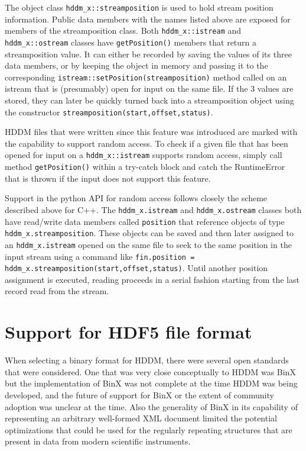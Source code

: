 \documentclass{revtex4}
\begin{document}
The object class \texttt{hddm\_x::streamposition} is used to hold stream
position information. Public data members with the names listed above are
exposed for members of the streamposition class. Both \texttt{hddm\_x::istream}
and \texttt{hddm\_x::ostream} classes have \texttt{getPosition()} members that
return a streamposition value. It can either be recorded by saving the values
of its three data members, or by keeping the object in memory and passing it
to the corresponding \texttt{istream::setPosition(streamposition)} method
called on an istream that is (presumably) open for input on the same file.
If the 3 values are stored, they can later be quickly turned back into a
streamposition object using the constructor 
\texttt{streamposition(start,offset,status)}.

HDDM files that were written since this feature was introduced are marked
with the capability to support random access. To check if a given file that
has been opened for input on a \texttt{hddm\_x::istream} supports random access,
simply call method \texttt{getPosition()} within a try-{}catch block and catch
the RuntimeError that is thrown if the input does not support this feature.

Support in the python API for random access follows closely the scheme
described above for C++. The \texttt{hddm\_x.istream} and 
\texttt{hddm\_x.ostream} classes both have read/write data members called
\texttt{position} that reference objects of type \texttt{hddm\_x.streamposition}.
These objects can be saved and then later assigned to an
\texttt{hddm\_x.istream} opened on the same file to seek to the same position
in the input stream using a command like
\texttt{fin.position = hddm\_x.streamposition(start,offset,status)}. Until
another position assignment is executed, reading proceeds in a serial
fashion starting from the last record read from the stream.

\section{Support for HDF5 file format}

When selecting a binary format for HDDM, there were several open standards
that were considered. One that was very close conceptually to HDDM was 
BinX~\cite{binx} but the implementation of BinX was not complete at the
time HDDM was being developed, and the future of support for BinX or the
extent of community adoption was unclear at the time. Also the generality
of BinX in its capability of representing an arbitrary well-formed XML
document limited the potential optimizations that could be used for the
regularly repeating structures that are present in data from modern
scientific instruments.
\end{document}
